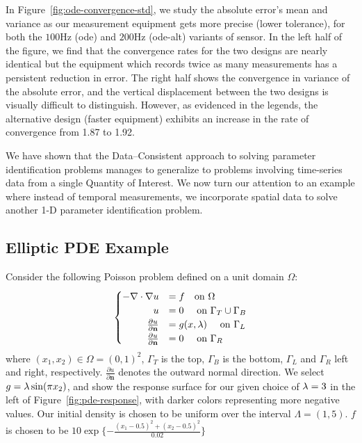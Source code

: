 In Figure~\ref{fig:ode-convergence-std}, we study the absolute error's mean and variance as our measurement equipment gets more precise (lower tolerance), for both the $100$Hz (ode) and $200$Hz (ode-alt) variants of sensor.
In the left half of the figure, we find that the convergence rates for the two designs are nearly identical but the equipment which records twice as many measurements has a persistent reduction in error.
The right half shows the convergence in variance of the absolute error, and the vertical displacement between the two designs is visually difficult to distinguish.
However, as evidenced in the legends, the alternative design (faster equipment) exhibits an increase in the rate of convergence from 1.87 to 1.92.

We have shown that the Data--Consistent approach to solving parameter identification problems manages to generalize to problems involving time-series data from a single Quantity of Interest.
We now turn our attention to an example where instead of temporal measurements, we incorporate spatial data to solve another 1-D parameter identification problem.

\FloatBarrier
\subsection{Elliptic PDE Example}\label{subsec:pde-example}

Consider the following Poisson problem defined on a unit domain $\Omega$:
\begin{equation}\label{eq:pde-equation}
\begin{cases}
\hfill -\nabla \cdot \nabla u &= f \quad\text{on } \Omega \\
\hfill u &= 0 \quad\text{ on } \Gamma_T \cup \Gamma_B \\
\hfill \frac{\partial u}{\partial \mathbf{n}} &= g(x,\param) \quad\text{ on } \Gamma_L \\
\hfill \frac{\partial u}{\partial \mathbf{n}} &= 0 \quad\text{ on } \Gamma_R
\end{cases}
\end{equation}
where $(x_1, x_2) \in \Omega = (0,1)^2$, $\Gamma_T$ is the top, $\Gamma_B$ is the bottom, $\Gamma_L$ and $\Gamma_R$ left and right, respectively.
$\frac{\partial u}{\partial \mathbf{n}}$ denotes the outward normal direction.
We select $g=\lambda \sin(\pi x_2)$, and show the response surface for our given choice of $\lambda = 3$ in the left of Figure~\ref{fig:pde-response}, with darker colors representing more negative values.
Our initial density is chosen to be uniform over the interval $\Lambda = (1,5)$.
$f$ is chosen to be $10\exp\{-\frac{(x_1-0.5)^2 + (x_2 - 0.5)^2}{0.02}\}$


